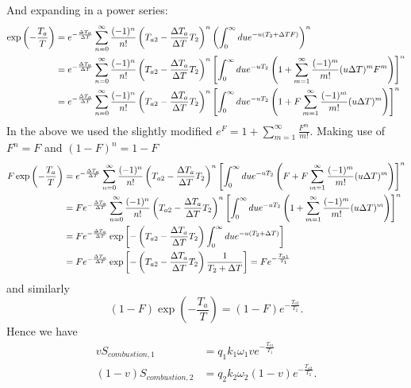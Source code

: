\documentclass[12pt]{article}
\begin{document}
And expanding in a power series: 
\begin{align}
     \exp \left( -\frac{T_a}{T}\right)&=e^{-\frac{\Delta T_a}{\Delta T}} \sum_{n=0}^\infty \frac{(-1)^n}{n!}  \left(T_{a2}-\frac{\Delta T_a}{\Delta T}T_2 \right)^n \left( \int_0 ^{\infty}due^{-u(T_2+\Delta TF)}\right)^n \notag \\
     &=e^{-\frac{\Delta T_a}{\Delta T}} \sum_{n=0}^\infty \frac{(-1)^n}{n!}  \left(T_{a2}-\frac{\Delta T_a}{\Delta T}T_2 \right)^n \left[ \int_0 ^{\infty}due^{-uT_2}\left(1+\sum_{m=1}^\infty \frac{(-1)^m}{m!}(u\Delta T)^m F^m\right)\right]^n \notag \\
     &=e^{-\frac{\Delta T_a}{\Delta T}} \sum_{n=0}^\infty \frac{(-1)^n}{n!}  \left(T_{a2}-\frac{\Delta T_a}{\Delta T}T_2 \right)^n \left[ \int_0 ^{\infty}due^{-uT_2}\left(1+F\sum_{m=1}^\infty \frac{(-1)^m}{m!}(u\Delta T)^m \right)\right]^n
\end{align}
In the above we used the slightly modified $e^{F}=1+\sum_{m=1}^\infty \frac{F^m}{m!}$. Making use of $F^n=F$ and $(1-F)^n=1-F$
\begin{align}
    F\exp{\left( -\frac{T_a}{T}\right)}&=e^{-\frac{\Delta T_a}{\Delta T}} \sum_{n=0}^\infty \frac{(-1)^n}{n!}  \left(T_{a2}-\frac{\Delta T_a}{\Delta T}T_2 \right)^n \left[ \int_0 ^{\infty}due^{-uT_2}\left(F+F\sum_{m=1}^\infty \frac{(-1)^m}{m!}(u\Delta T)^m \right)\right]^n \notag \\
    &=Fe^{-\frac{\Delta T_a}{\Delta T}} \sum_{n=0}^\infty \frac{(-1)^n}{n!}  \left(T_{a2}-\frac{\Delta T_a}{\Delta T}T_2 \right)^n \left[ \int_0 ^{\infty}due^{-uT_2}\left(1+\sum_{m=1}^\infty \frac{(-1)^m}{m!}(u\Delta T)^m \right)\right]^n \notag \\
    &=Fe^{-\frac{\Delta T_a}{\Delta T}}\exp{\left[ -\left( T_{a2}-\frac{\Delta T_a}{\Delta T}T_2\right) \int_0 ^\infty du e^{ -u(T_2+\Delta T)} \right]} \notag \\
    &=Fe^{-\frac{\Delta T_a}{\Delta T}}\exp{\left[ -\left( T_{a2}-\frac{\Delta T_a}{\Delta T}T_2\right) \frac{1}{T_2 + \Delta T} \right]}=Fe^{-\frac{T_{a1}}{T_1}}
\end{align}
and similarly 
\begin{equation}
    (1-F)\exp{\left( -\frac{T_a}{T}\right)}=(1-F)e^{-\frac{T_{a2}}{T_2}}.
\end{equation}
Hence we have 
\begin{align}
    vS_{combustion,1}&=q_1 k_1 \omega_1ve^{-\frac{T_{a1}}{T_1}}  \\
    (1-v)S_{combustion,2}&=q_2 k_2 \omega_2(1-v)e^{-\frac{T_{a2}}{T_2}}.
\end{align}
\end{document}
